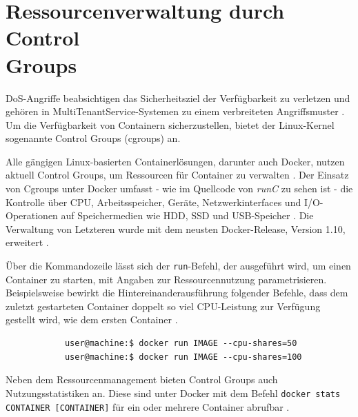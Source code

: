 \documentclass[../main.tex]{subfiles}
\begin{document}
	\section{Ressourcenverwaltung durch Control\\Groups}
  \label{secCgroups}
		\acrshort{DoS}-Angriffe beabsichtigen das Sicherheitsziel der Verfügbarkeit zu verletzen und gehören in \gls{MultiTenantService}-Systemen zu einem verbreiteten Angriffsmuster \cite[S.5]{dockerSec1}. Um die Verfügbarkeit von Containern sicherzustellen, bietet der Linux-Kernel sogenannte Control Groups (\acrshort{cgroups}) an.

		Alle gängigen Linux-basierten Containerlösungen, darunter auch Docker, nutzen aktuell Control Groups, um Ressourcen für Container zu verwalten \cite[S.16]{dockerSec2}. Der Einsatz von Cgroups unter Docker umfasst - wie im Quellcode von \emph{runC} zu sehen ist - die Kontrolle über \acrshort{CPU}, Arbeitsspeicher, Geräte, Netzwerkinterfaces und \acrshort{I/O}-Operationen auf Speichermedien wie \acrshort{HDD}, \acrshort{SSD} und \acrshort{USB}-Speicher \cite{cgroupsRedhat}\cite{githubRunCCgroups}. Die Verwaltung von Letzteren wurde mit dem neusten Docker-Release, Version 1.10, erweitert \cite{docker110}.


		Über die Kommandozeile lässt sich der \texttt{run}-Befehl, der ausgeführt wird, um einen Container zu starten, mit Angaben zur Ressourcennutzung parametrisieren. Beispielsweise bewirkt die Hintereinanderausführung folgender Befehle, dass dem zuletzt gestarteten Container doppelt so viel CPU-Leistung zur Verfügung gestellt wird, wie dem ersten Container \cite{dockerRun}.

		\begin{lstlisting}
			user@machine:$ docker run IMAGE --cpu-shares=50
			user@machine:$ docker run IMAGE --cpu-shares=100
		\end{lstlisting}

		Neben dem Ressourcenmanagement bieten Control Groups auch Nutzungsstatistiken an. Diese sind unter Docker mit dem Befehl \texttt{docker stats CONTAINER [CONTAINER]} für ein oder mehrere Container abrufbar \cite{dockerMetrics}.
\end{document}
